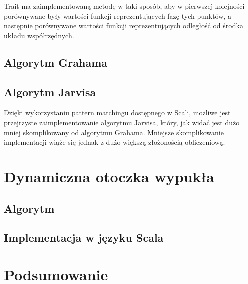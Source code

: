    	 	Trait  ma zaimplementowaną metodę  w taki sposób, aby w pierwszej kolejności porównywane były wartości funkcji reprezentujących fazę tych punktów, a następnie porównywane wartości funkcji reprezentujących odległość od środka układu współrzędnych.
   		
   		
   		\newpage
   		
   		\newpage
   		
   		\newpage
   		\section{Algorytm Grahama}
   		
   		\newpage
   		
   		\newpage
   		
   		
   		\section{Algorytm Jarvisa}
   		Dzięki wykorzystaniu pattern matchingu dostępnego w Scali, możliwe jest przejrzyste zaimplementowanie algorytmu Jarvisa, który, jak widać jest dużo mniej skomplikowany od algorytmu Grahama. Mniejsze skomplikowanie implementacji wiąże się jednak z dużo większą złożonością obliczeniową.
        
        
    \chapter{Dynamiczna otoczka wypukła}
    	\section{Algorytm}
    	\section{Implementacja w języku Scala} 
	\chapter{Podsumowanie} 
      
    

